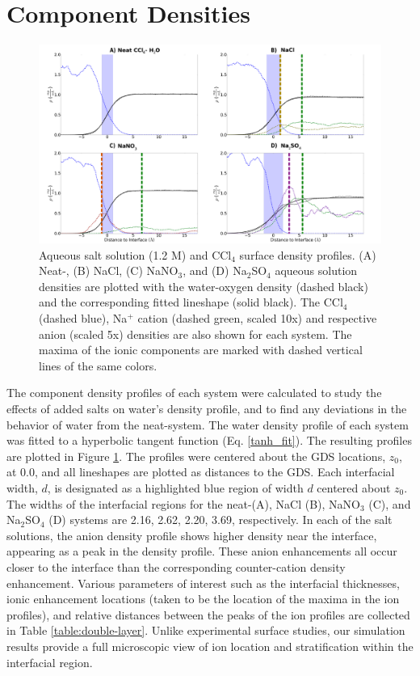 \section{Component Densities}

\begin{figure}[h!]
\begin{center}
	\includegraphics[scale=1.0]{images/densities.png}
	\caption{Aqueous salt solution (1.2 M) and CCl$_4$ surface density profiles. (A) Neat-\ctcwat, (B) NaCl, (C) NaNO$_3$, and (D) Na$_2$SO$_4$ aqueous solution densities are plotted with the water-oxygen density (dashed black) and the corresponding fitted lineshape (solid black). The CCl$_4$ (dashed blue), Na$^+$ cation (dashed green, scaled 10x) and respective anion (scaled 5x) densities are also shown for each system. The maxima of the ionic components are marked with dashed vertical lines of the same colors.}
	\label{fig:density-plots}
\end{center}
\end{figure}

The component density profiles of each system were calculated to study the effects of added salts on water's density profile, and to find any deviations in the behavior of water from the neat-\ctcwat system. The water density profile of each system was fitted to a hyperbolic tangent function (Eq. \ref{tanh_fit}). The resulting profiles are plotted in Figure \ref{fig:density-plots}. The profiles were centered about the GDS locations, $z_0$, at 0.0\angs, and all lineshapes are plotted as distances to the GDS. Each interfacial width, $d$, is designated as a highlighted blue region of width $d$ centered about $z_0$. The widths of the interfacial regions for the neat-\ctcwat (A), NaCl (B), NaNO$_3$ (C), and Na$_2$SO$_4$ (D) systems are 2.16, 2.62, 2.20, 3.69\angs, respectively. In each of the salt solutions, the anion density profile shows higher density near the interface, appearing as a peak in the density profile. These anion enhancements all occur closer to the interface than the corresponding counter-cation density enhancement. Various parameters of interest such as the interfacial thicknesses, ionic enhancement locations (taken to be the location of the maxima in the ion profiles), and relative distances between the peaks of the ion profiles are collected in Table \ref{table:double-layer}. Unlike experimental surface studies, our simulation results provide a full microscopic view of ion location and stratification within the interfacial region.

